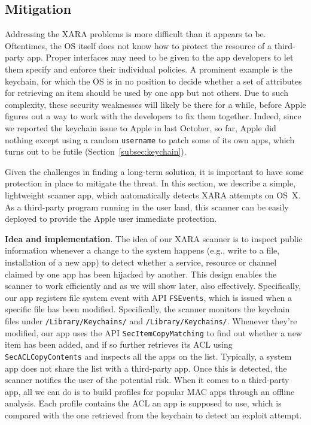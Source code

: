 \documentclass{article}
\newcommand{\ignore}[1]{}
\begin{document}
\vspace {-5pt}
\subsection{Mitigation}
\label{subsec:defense}


Addressing the XARA problems is more difficult than it appears to be.\ignore{Changes may need to be made to the Apple access control framework to enforce the policies such as which NSConnection client is allowed to get the object from a specific server. Further complicating the situation is the fact that} Oftentimes, the OS itself does not know how to protect the resource of a third-party app.  Proper interfaces may need to be given to the app developers to let them specify and enforce their individual policies. A prominent example is the keychain, for which the OS is in no position to decide whether a set of attributes for retrieving an item should be used by one app but not others. Due to such complexity, these security weaknesses will likely be there for a while, before Apple figures out a way to work with the developers to fix them together. Indeed, since we reported the keychain issue to Apple in last October, so far, Apple did nothing except using a random \texttt{username} to patch some of its own apps, which turns out to be futile (Section~\ref{subsec:keychain}).

Given the challenges in finding a long-term solution\ignore{ for these problems}, it is important to have some protection in place to mitigate the threat\ignore{, informing Apple users whenever the security risks show up}. In this section, we describe a simple, lightweight scanner app, which automatically detects XARA attempts on OS~X.  As a third-party program running in the user land, this scanner can be easily deployed to provide the Apple user immediate protection.


\vspace {3pt}\noindent\textbf{Idea and implementation}. The idea of our XARA scanner is to inspect public information whenever a change to the system happens (e.g., write to a file, installation of a new app) to detect whether a service, resource or channel claimed by one app has been hijacked by another. This design enables the scanner to work efficiently and as we will show later, also effectively.  Specifically, our app registers file system event with API \texttt{FSEvents}, which is issued when a specific file has been modified. Specifically, the scanner monitors the keychain files under \texttt{/Library/Keychains/} and \texttt{/Library/Keychains/}. Whenever they're modified, our app uses the API \texttt{SecItemCopyMatching} to find out whether a new item has been added, and if so further retrieves its ACL using \texttt{SecACLCopyContents} and inspects all the apps on the list. Typically, a system app does not share the list with a third-party app.  Once this is detected, the scanner notifies the user of the potential risk\ignore{ and suggests the protection measure that can be taken}. When it comes to a third-party app, all we can do is to build profiles for popular MAC apps through an offline analysis. Each profile contains the ACL an app is supposed to use, which is compared with the one retrieved from the keychain to detect an exploit attempt.
\end{document}
